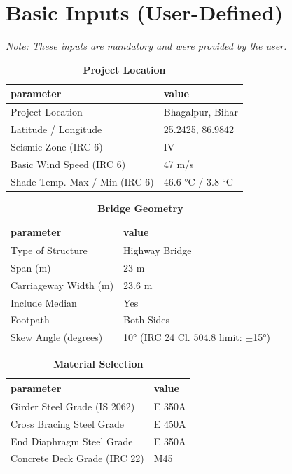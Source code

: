 \documentclass[12pt,a4paper]{report}
\numberwithin{table}{chapter}
\numberwithin{figure}{chapter}
\begin{document}
\section{Basic Inputs (User-Defined)}
\label{sec:basic-inputs}

\noindent\textit{Note: These inputs are mandatory and were provided by the user.}

\begin{table}[H]
\caption{\textbf{Project Location}}
\label{subsec:project-location}
\begin{tabular}{|L{5.5cm}|L{8.5cm}|}
\hline
\textbf{parameter} & \textbf{value} \\
\hline
\textnormal{Project Location} & Bhagalpur, Bihar \\
\hline
\textnormal{Latitude / Longitude} & 25.2425, 86.9842 \\
\hline
\textnormal{Seismic Zone (IRC 6)} & IV \\
\hline
\textnormal{Basic Wind Speed (IRC 6)} & 47 m/s \\
\hline
\textnormal{Shade Temp. Max / Min (IRC 6)} & 46.6 °C / 3.8 °C \\
\hline
\end{tabular}
\vspace{0.4cm}
\end{table}

\begin{table}[H]
\caption{\textbf{Bridge Geometry}}
\label{subsec:bridge-geometry}
\begin{tabular}{|L{5.5cm}|L{8.5cm}|}
\hline
\textbf{parameter} & \textbf{value} \\
\hline
\textnormal{Type of Structure} & Highway Bridge \\
\hline
\textnormal{Span (m)} & 23 m \\
\hline
\textnormal{Carriageway Width (m)} & 23.6 m \\
\hline
\textnormal{Include Median} & Yes \\
\hline
\textnormal{Footpath} & Both Sides \\
\hline
\textnormal{Skew Angle (degrees)} & 10° (IRC 24 Cl. 504.8 limit: $\pm$15°) \\
\hline
\end{tabular}
\end{table}
\vspace{0.4cm}

\begin{table}[H]
\caption{\textbf{Material Selection}}
\label{subsec:material}
\begin{tabular}{|L{5.5cm}|L{8.5cm}|}
\hline
\textbf{parameter} & \textbf{value} \\
\hline
\textnormal{Girder Steel Grade (IS 2062)} & E 350A \\
\hline
\textnormal{Cross Bracing Steel Grade} & E 450A \\
\hline
\textnormal{End Diaphragm Steel Grade} & E 350A \\
\hline
\textnormal{Concrete Deck Grade (IRC 22)} & M45 \\
\hline
\end{tabular}
\end{table}
\vspace{0.4cm}
\end{document}
